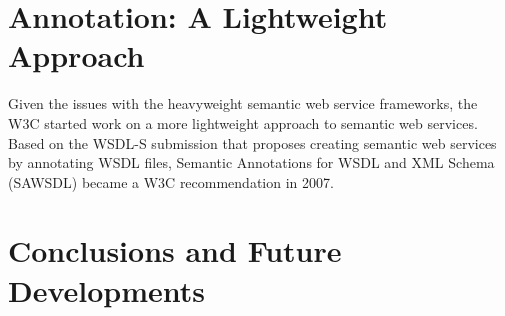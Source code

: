 \section{Annotation: A Lightweight Approach}

Given the issues with the heavyweight semantic web service frameworks, the W3C
started work on a more lightweight approach to semantic web services. Based on
the WSDL-S submission that proposes creating semantic web services by annotating
WSDL files, Semantic Annotations for WSDL and XML Schema (SAWSDL) became a W3C
recommendation in 2007.  

\section{Conclusions and Future Developments}

